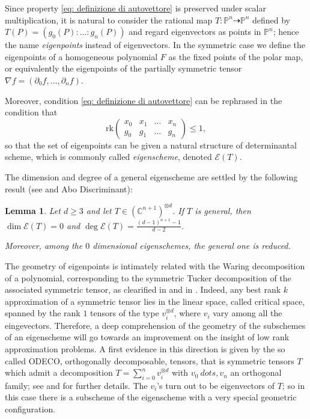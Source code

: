 \documentclass{amsart}
\theoremstyle{plain}
\newtheorem{lemma}{Lemma}[section]
\theoremstyle{definition}
\newcommand{\C}{\mathbb{C}}
\newcommand{\p}{\mathbb{P}}
\newcommand{\de}{\partial}
\newcommand{\Eig}[1]{\mathcal{E}\!\left( {#1} \right)}
\newcommand{\rk}{\ensuremath{\mathrm{rk}}}
\begin{document}
Since %
property \eqref{eq: definizione di autovettore} is preserved under scalar multiplication, it is natural to consider the rational map $T:\p^n\dashrightarrow\p^n$ defined by $T(P)=(g_0(P):\ldots:g_n(P))$ and regard eigenvectors as points in $\p^n$; hence the name \emph{eigenpoints} instead of eigenvectors. In the symmetric case we define the eigenpoints of a homogeneous polynomial $F$ as the fixed points of the polar map, or equivalently the eigenpoints of the partially symmetric tensor $\nabla f =(\de_0f,\dots,\de_n f)$.

Moreover, condition \eqref{eq: definizione di autovettore} can be rephrased in the condition that
\begin{equation}
\label{eq:def_matrix_general}
    \rk \begin{pmatrix}
    x_0 & x_1 & \dots & x_n \\
    g_0 & g_1 & \dots & g_n
    \end{pmatrix} \le 1,
\end{equation}
so that the set of eigenpoints can be given a natural structure of determinantal scheme, which is commonly called \emph{eigenscheme}, denoted $\Eig{T}$.

The dimension and degree of a general eigenscheme are settled by the following result (see \cite[Theorem 2.1]{CartSturm} and Abo Discriminant):

\begin{lemma}\label{lem:nonempty}
Let $d\ge 3$ and let $T \in (\C^{n+1})^{\otimes d}$.
If $T$ is general, then $\dim \Eig{T}=0$ and $\deg \Eig{T}=\frac{(d-1)^{n+1}-1}{d-2}$.

  Moreover, among the $0$ dimensional eigenschemes, the general one is reduced.
\end{lemma}

The geometry of eigenpoints is intimately related with the Waring decomposition of a polynomial,
corresponding to the symmetric Tucker decomposition of the associated symmetric tensor,
as clearified
in \cite{DOT} and in \cite{Ott}. Indeed, any best rank $k$ approximation of a symmetric tensor lies in the linear
space, called {critical space},  spanned by the rank $1$ tensors of the type $v_i ^{\otimes d}$, where $v_i$ vary among all the eingevectors. Therefore, a deep comprehension of the geometry of the subschemes of an eigenscheme will 
go towards an improvement on the insight of low rank approximation problems. A first evidence in this direction is given by the so called ODECO, orthogonally decomposable, tensors, that is symmetric tensors $T$ which admit a decomposition 
$T= \sum _{i=0}^n v_i ^{\otimes d}$ with $v_0 \ dots , v_n$ an orthogonal family; see \cite{Rob} and \cite{BDHE}
for further details. The $v_i$'s turn out to be eigenvectors of $T$; so in this case there is a subscheme of the eigenscheme with a very special geometric configuration. 
\end{document}
